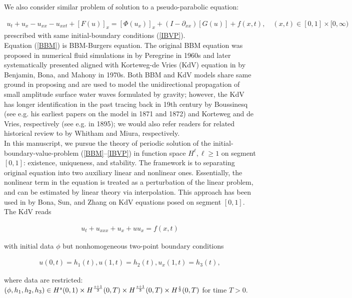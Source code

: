 \documentclass[10pt,a4paper,final]{article}
\numberwithin{equation}{section}
\begin{document}
We also consider similar problem of solution to a pseudo-parabolic equation:

\begin{eqnarray}
\label{eqmain2}
u_t+u_x-u_{xx}-u_{xxt}+[F(u)]_x=[\Phi(u_x)]_x+(I-\partial_{xx})[G(u)]+f(x,t),  \quad (x, t)\in [0,1]\times [0, \infty)
\end{eqnarray} prescribed with same initial-boundary conditions (\ref{IBVP}). \\


Equation (\ref{BBM}) is BBM-Burgers equation. The original BBM equation was proposed in numerical fluid simulations in \cite{Peregrine} by Peregrine in 1960s and later systematically presented aligned with Korteweg-de Vries (KdV) equation in \cite{BBM} by Benjamin, Bona, and Mahony in 1970s. Both BBM and KdV models share same ground in proposing and are used to model the unidirectional propagation of small amplitude surface water waves formulated  by gravity; however, the KdV has longer identification in the past tracing back in 19th century by 
Boussinesq ({see e.g. his earliest papers on the model \cite{Bouss1, Bouss2} in 1871 and 1872}) and Korteweg and de Vries, respectively (see e.g. \cite{KDV} in 1895); we would also refer readers for related historical review to \cite{Whitham, Miura} by Whitham and Miura, respectively. \\

In this manuscript, we pursue the theory of periodic solution of the initial-boundary-value-problem (\ref{BBM}--\ref{IBVP}) in function space $H^\ell, \ell\ge 1$ on segment $[0,1]$: existence, uniqueness, and stability. The framework is to separating original equation into two auxiliary linear and nonlinear ones. Essentially, the nonlinear term in the equation is treated as a perturbation of the linear problem, and can be estimated by linear theory via interpolation. This approach has been used in \cite{BSZ3, BSZ5} by Bona, Sun, and Zhang on KdV equations posed on segment $[0, 1]$. The KdV reads

\begin{eqnarray*}
u_t + u_{xxx} + u_x + uu_x = f(x,t)
\end{eqnarray*}

\noindent with initial data $\phi$ but nonhomogeneous two-point boundary conditions

\begin{eqnarray*}
u(0,t)=h_1(t), u(1,t)=h_2(t), u_x(1,t)=h_3(t), 
\end{eqnarray*}

\noindent where data are restricted: $(\phi, h_1, h_2, h_3)\in H^s(0, 1)\times H^{s+1\over 3}(0, T)\times H^{s+1\over 3}(0, T)\times H^{s\over 3}(0, T)$ for time $T> 0$. \\
\end{document}
